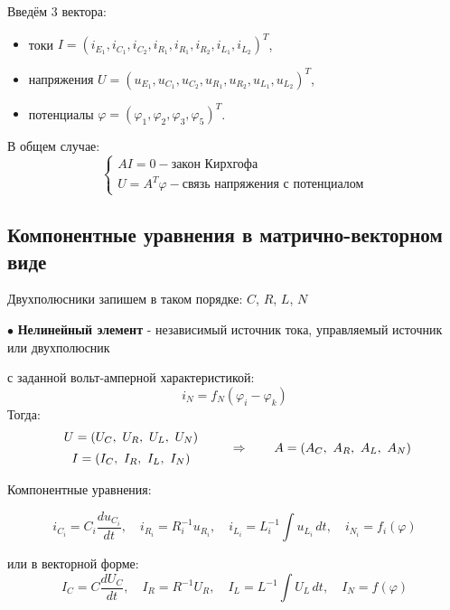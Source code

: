 	\newpage
	
	Введём 3 вектора: 
	\begin{itemize}
		\item токи \(I = (i_{E_1}, i_{C_1}, i_{C_2}, i_{R_1}, i_{R_1}, i_{R_2}, i_{L_1}, i_{L_2})^T\), 
		\item напряжения \(U = (u_{E_1}, u_{C_1}, u_{C_2}, u_{R_1}, u_{R_2}, u_{L_1}, u_{L_2})^T\),
		\item потенциалы \(\varphi = (\varphi_1, \varphi_2, \varphi_3, \varphi_5)^T\).
	\end{itemize}
	В общем случае:
	\[
	\begin{cases} 
		A I = 0 - \text{закон Кирхгофа}\\ 
		U = A^T\varphi - \text{связь напряжения с потенциалом}
	\end{cases}
	\]

	\subsection{Компонентные уравнения в матрично-векторном виде}
	Двухполюсники запишем в таком порядке: $C$, $R$, $L$, $N$
	\par
	$\bullet$ \textbf{Нелинейный элемент} - независимый источник тока, управляемый источник или двухполюсник 
	\par
	с заданной вольт-амперной характеристикой:
	\[
		i_N = f_N(\varphi_i - \varphi_k)
	\]
	Тогда:
	\begin{equation}
		\begin{array}{c}
			U = (U_C,\ U_R,\ U_L,\ U_N)
			\vspace{0.5em} \\
			I = (I_C,\ I_R,\ I_L,\ I_N)
		\end{array}
		\qquad
		\Rightarrow
		\qquad
		A = (A_C,\ A_R,\ A_L,\ A_N)
	\end{equation}
	
	Компонентные уравнения:
	
	\begin{equation}
		i_{C_i} = C_i \frac{du_{C_i}}{dt}, \quad
		i_{R_i} = R_i^{-1} u_{R_i}, \quad
		i_{L_i} = L_i^{-1} \int u_{L_i} \, dt, \quad
		i_{N_i} = f_i(\varphi)
	\end{equation}
	
	или в векторной форме:
	\begin{equation}
		I_C = C \frac{dU_C}{dt}, \quad
		I_R = R^{-1} U_R, \quad
		I_L = L^{-1} \int U_L \, dt, \quad
		I_N = f(\varphi)
	\end{equation}
	
